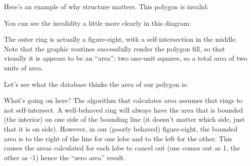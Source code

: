\documentclass[a4paper,11pt,english]{sphinxmanual}
\begin{document}
Here’s an example of why structure matters. This polygon is invalid:

\begin{sphinxVerbatim}[commandchars=\\\{\}]
             
\end{sphinxVerbatim}

You can see the invalidity a little more clearly in this diagram:

\noindent{}

The outer ring is actually a figure-eight, with a self-intersection in the middle. Note that the graphic routines successfully render the polygon fill, so that visually it is appears to be an “area”: two one-unit squares, so a total area of two units of area.

Let’s see what the database thinks the area of our polygon is:

\begin{sphinxVerbatim}[commandchars=\\\{\}]
 
\end{sphinxVerbatim}

\begin{sphinxVerbatim}[commandchars=\\\{\}]
\end{sphinxVerbatim}

What’s going on here? The algorithm that calculates area assumes that rings to not self-intersect. A well-behaved ring will always have the area that is bounded (the interior) on one side of the bounding line (it doesn’t matter which side, just that it is on  side). However, in our (poorly behaved) figure-eight, the bounded area is to the right of the line for one lobe and to the left for the other. This causes the areas calculated for each lobe to cancel out (one comes out as 1, the other as -1) hence the “zero area” result.
\end{document}
